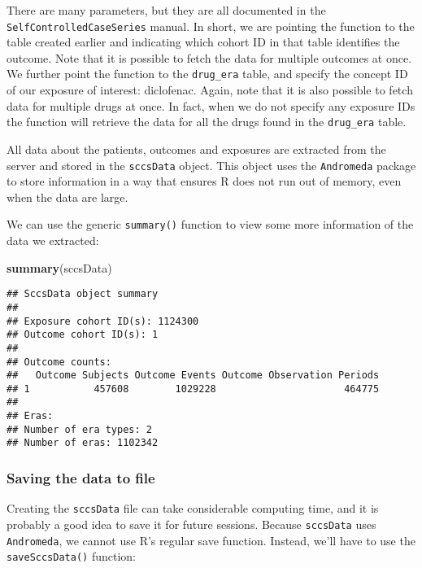 \documentclass[
]{article}
\newenvironment{Shaded}{\begin{snugshade}}{\end{snugshade}}
\newcommand{\KeywordTok}[1]{\textcolor[rgb]{0.13,0.29,0.53}{\textbf{#1}}}
\newcommand{\NormalTok}[1]{#1}
\begin{document}
There are many parameters, but they are all documented in the
\texttt{SelfControlledCaseSeries} manual. In short, we are pointing the
function to the table created earlier and indicating which cohort ID in
that table identifies the outcome. Note that it is possible to fetch the
data for multiple outcomes at once. We further point the function to the
\texttt{drug\_era} table, and specify the concept ID of our exposure of
interest: diclofenac. Again, note that it is also possible to fetch data
for multiple drugs at once. In fact, when we do not specify any exposure
IDs the function will retrieve the data for all the drugs found in the
\texttt{drug\_era} table.

All data about the patients, outcomes and exposures are extracted from
the server and stored in the \texttt{sccsData} object. This object uses
the \texttt{Andromeda} package to store information in a way that
ensures R does not run out of memory, even when the data are large.

We can use the generic \texttt{summary()} function to view some more
information of the data we extracted:

\begin{Shaded}
\begin{Highlighting}[]
\KeywordTok{summary}\NormalTok{(sccsData)}
\end{Highlighting}
\end{Shaded}

\begin{verbatim}
## SccsData object summary
## 
## Exposure cohort ID(s): 1124300
## Outcome cohort ID(s): 1
## 
## Outcome counts:
##   Outcome Subjects Outcome Events Outcome Observation Periods
## 1           457608        1029228                      464775
## 
## Eras:
## Number of era types: 2
## Number of eras: 1102342
\end{verbatim}

\hypertarget{saving-the-data-to-file}{%
\subsubsection{Saving the data to file}\label{saving-the-data-to-file}}

Creating the \texttt{sccsData} file can take considerable computing
time, and it is probably a good idea to save it for future sessions.
Because \texttt{sccsData} uses \texttt{Andromeda}, we cannot use R's
regular save function. Instead, we'll have to use the
\texttt{saveSccsData()} function:
\end{document}
